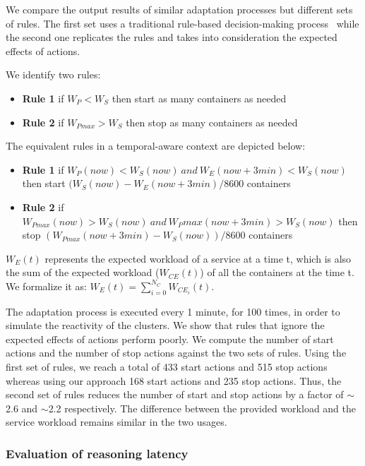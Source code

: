 We compare the output results of similar adaptation processes but different sets of rules.
The first set uses a traditional rule-based decision-making process~\cite{aamodt1994case,anicic2010rule} while the second one replicates the rules and takes into consideration the expected effects of actions.

We identify two rules:
\begin{itemize}
	\item \textbf{Rule 1} if $W_P < W_S$  then start as many containers as needed
	\item \textbf{Rule 2} if $W_{Pmax} > W_S$ then stop as many containers as needed
\end{itemize}

The equivalent rules in a temporal-aware context are depicted below:

\begin{itemize}
	\item \textbf{Rule 1} if $W_P(now) < W_S(now)~and~W_E(now+3min) < W_S(now)$  then start $(W_S(now) - W_E(now+3min) / 8600$ containers
	\item \textbf{Rule 2} if $W_{Pmax}(now) > W_S(now)~and~W_Pmax(now+3min) > W_S(now)$ then stop $(W_{Pmax}(now+3min) - W_S(now)) / 8600$ containers
\end{itemize}

$W_E(t)$ represents the expected workload of a service at a time t, which is also the sum of the expected workload ($W_{CE}(t)$) of all the containers at the time t.
We formalize it as: $W_E(t) = \sum_{i=0}^{N_C}W_{CE_i}(t)$.

The adaptation process is executed every 1 minute, for 100 times, in order to simulate the reactivity of the clusters. 
We show that rules that ignore the expected effects of actions perform poorly.
We compute the number of start actions and the number of stop actions against the two sets of rules. 
Using the first set of rules, we reach a total of 433 start actions and 515 stop actions whereas using our approach 168 start actions and 235 stop actions. 
Thus, the second set of rules reduces the number of start and stop actions by a factor of $\sim$2.6 and $\sim$2.2 respectively. 
The difference between the provided workload and the service workload remains similar in the two usages.

\subsubsection{Evaluation of reasoning latency}
\label{sec:evaluation_latency}

